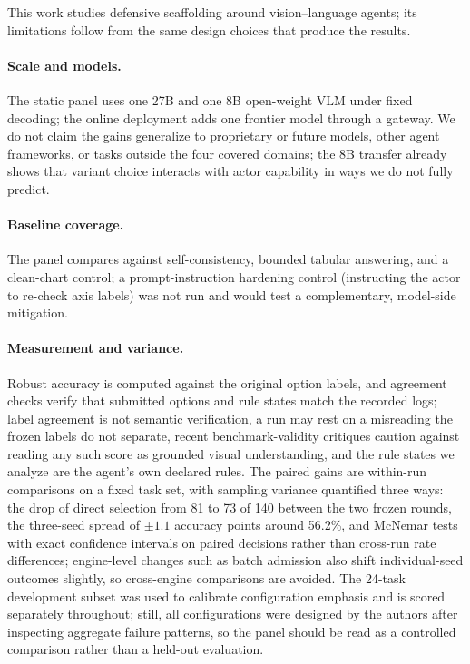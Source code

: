 This work studies defensive scaffolding around
vision--language agents; its limitations follow from
the same design choices that produce the results.

\paragraph{Scale and models.}
The static panel uses one 27B and one 8B open-weight
VLM under fixed decoding; the online deployment adds
one frontier model through a gateway.
We do not claim the gains generalize to proprietary or
future models, other agent frameworks, or tasks outside
the four covered domains; the 8B transfer already shows that variant choice interacts with actor capability in ways we do not fully predict.

\paragraph{Baseline coverage.}
The panel compares against self-consistency, bounded
tabular answering, and a clean-chart control; a
prompt-instruction hardening control (instructing the
actor to re-check axis labels) was not run and would
test a complementary, model-side mitigation.

\paragraph{Measurement and variance.}
Robust accuracy is computed against the original option
labels, and agreement checks verify that submitted
options and rule states match the recorded logs; label
agreement is not semantic verification, a run may rest on a misreading the frozen labels do not separate, recent benchmark-validity critiques \citep{lan2026seeing} caution against reading any such score as grounded visual understanding, and the rule states we analyze are the agent's own declared rules.
The paired gains are within-run comparisons on a fixed
task set, with sampling variance quantified three ways:
the drop of direct selection from 81 to 73 of 140
between the two frozen rounds, the three-seed spread of
$\pm1.1$ accuracy points around 56.2\%, and McNemar
tests with exact confidence intervals on paired
decisions rather than cross-run rate differences;
engine-level changes such as batch admission also shift
individual-seed outcomes slightly, so cross-engine
comparisons are avoided.
The 24-task development subset was used to calibrate
configuration emphasis and is scored separately
throughout; still, all configurations were designed by
the authors after inspecting aggregate failure
patterns, so the panel should be read as a controlled
comparison rather than a held-out evaluation.

